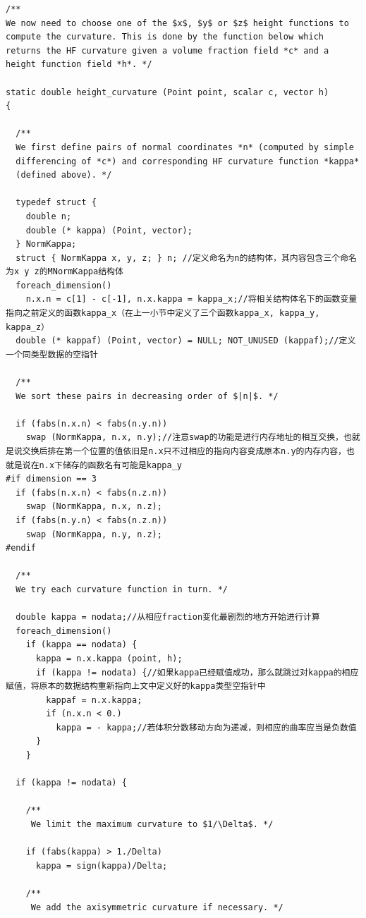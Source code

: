 \documentclass[lang=cn,11pt,a4paper]{elegantpaper}
\begin{document}
\begin{verbatim}
/**
We now need to choose one of the $x$, $y$ or $z$ height functions to
compute the curvature. This is done by the function below which
returns the HF curvature given a volume fraction field *c* and a
height function field *h*. */

static double height_curvature (Point point, scalar c, vector h)
{

  /**
  We first define pairs of normal coordinates *n* (computed by simple
  differencing of *c*) and corresponding HF curvature function *kappa*
  (defined above). */

  typedef struct {
    double n;
    double (* kappa) (Point, vector);
  } NormKappa;
  struct { NormKappa x, y, z; } n; //定义命名为n的结构体，其内容包含三个命名为x y z的MNormKappa结构体 
  foreach_dimension()
    n.x.n = c[1] - c[-1], n.x.kappa = kappa_x;//将相关结构体名下的函数变量指向之前定义的函数kappa_x（在上一小节中定义了三个函数kappa_x, kappa_y, kappa_z）
  double (* kappaf) (Point, vector) = NULL; NOT_UNUSED (kappaf);//定义一个同类型数据的空指针
  
  /**
  We sort these pairs in decreasing order of $|n|$. */
  
  if (fabs(n.x.n) < fabs(n.y.n))
    swap (NormKappa, n.x, n.y);//注意swap的功能是进行内存地址的相互交换，也就是说交换后排在第一个位置的值依旧是n.x只不过相应的指向内容变成原本n.y的内存内容，也就是说在n.x下储存的函数名有可能是kappa_y
#if dimension == 3
  if (fabs(n.x.n) < fabs(n.z.n))
    swap (NormKappa, n.x, n.z);
  if (fabs(n.y.n) < fabs(n.z.n))
    swap (NormKappa, n.y, n.z);
#endif

  /**
  We try each curvature function in turn. */

  double kappa = nodata;//从相应fraction变化最剧烈的地方开始进行计算
  foreach_dimension()
    if (kappa == nodata) {
      kappa = n.x.kappa (point, h);
      if (kappa != nodata) {//如果kappa已经赋值成功，那么就跳过对kappa的相应赋值，将原本的数据结构重新指向上文中定义好的kappa类型空指针中
        kappaf = n.x.kappa;
        if (n.x.n < 0.)
          kappa = - kappa;//若体积分数移动方向为递减，则相应的曲率应当是负数值
      }
    }

  if (kappa != nodata) {
    
    /**
     We limit the maximum curvature to $1/\Delta$. */

    if (fabs(kappa) > 1./Delta)
      kappa = sign(kappa)/Delta;
    
    /**
     We add the axisymmetric curvature if necessary. */
      

\end{verbatim}
\end{document}
